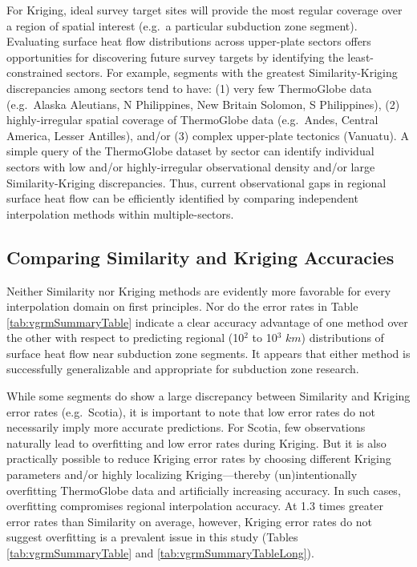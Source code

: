 For Kriging, ideal survey target sites will provide the most regular coverage over a region of spatial interest (e.g.~a particular subduction zone segment). Evaluating surface heat flow distributions across upper-plate sectors offers opportunities for discovering future survey targets by identifying the least-constrained sectors. For example, segments with the greatest Similarity-Kriging discrepancies among sectors tend to have: (1) very few ThermoGlobe data (e.g.~Alaska Aleutians, N Philippines, New Britain Solomon, S Philippines), (2) highly-irregular spatial coverage of ThermoGlobe data (e.g.~Andes, Central America, Lesser Antilles), and/or (3) complex upper-plate tectonics (Vanuatu). A simple query of the ThermoGlobe dataset by sector can identify individual sectors with low and/or highly-irregular observational density and/or large Similarity-Kriging discrepancies. Thus, current observational gaps in regional surface heat flow can be efficiently identified by comparing independent interpolation methods within multiple-sectors.

\hypertarget{comparing-similarity-and-kriging-accuracies}{%
\subsection{Comparing Similarity and Kriging Accuracies}\label{comparing-similarity-and-kriging-accuracies}}

Neither Similarity nor Kriging methods are evidently more favorable for every interpolation domain on first principles. Nor do the error rates in Table \ref{tab:vgrmSummaryTable} indicate a clear accuracy advantage of one method over the other with respect to predicting regional (10\(^2\) to 10\(^3\) \(km\)) distributions of surface heat flow near subduction zone segments. It appears that either method is successfully generalizable and appropriate for subduction zone research.

While some segments do show a large discrepancy between Similarity and Kriging error rates (e.g.~Scotia), it is important to note that low error rates do not necessarily imply more accurate predictions. For Scotia, few observations naturally lead to overfitting and low error rates during Kriging. But it is also practically possible to reduce Kriging error rates by choosing different Kriging parameters and/or highly localizing Kriging---thereby (un)intentionally overfitting ThermoGlobe data and artificially increasing accuracy. In such cases, overfitting compromises regional interpolation accuracy. At 1.3 times greater error rates than Similarity on average, however, Kriging error rates do not suggest overfitting is a prevalent issue in this study (Tables \ref{tab:vgrmSummaryTable} and \ref{tab:vgrmSummaryTableLong}).

